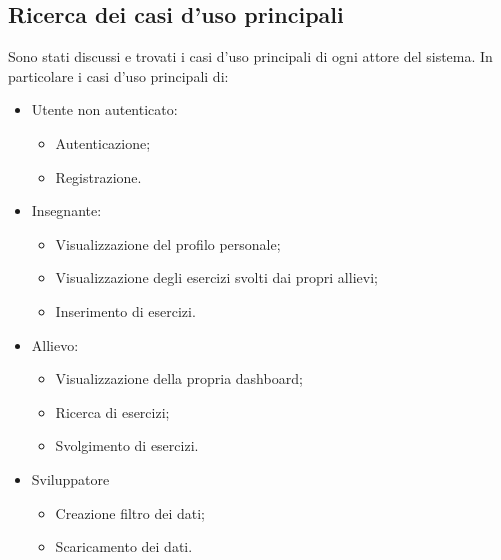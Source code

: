 \documentclass[a4paper, oneside, openany, dvipsnames, table]{article}
\begin{document}
\subsection{Ricerca dei casi d'uso principali} Sono stati discussi e trovati i casi d'uso principali di ogni attore del sistema. In particolare i casi d'uso principali di:
\begin{itemize}
\item Utente non autenticato:
	\begin{itemize}
		\item Autenticazione;
		\item Registrazione.
	\end{itemize}
\item Insegnante:
	\begin{itemize}
		\item Visualizzazione del profilo personale;
		\item Visualizzazione degli esercizi svolti dai propri allievi;
		\item Inserimento di esercizi.
	\end{itemize}
\item Allievo:
	\begin{itemize}
		\item Visualizzazione della propria dashboard;
		\item Ricerca di esercizi;
		\item Svolgimento di esercizi.
	\end{itemize}
\item Sviluppatore
	\begin{itemize}
		\item Creazione filtro dei dati;
		\item Scaricamento dei dati.
	\end{itemize}
\end{itemize}

\newpage
\end{document}

